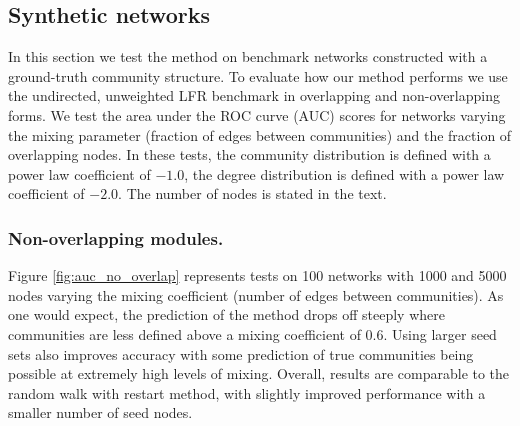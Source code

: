 \documentclass[sigconf]{acmart}
\begin{document}
\subsection{Synthetic networks}
In this section we test the method on benchmark networks constructed with a ground-truth community structure.
To evaluate how our method performs we use the undirected, unweighted LFR benchmark \cite{lancichinetti2008benchmark} in overlapping and non-overlapping forms.
We test the area under the ROC curve (AUC) scores for networks varying the mixing parameter (fraction of edges between communities) and the fraction of overlapping nodes.
In these tests, the community distribution is defined with a power law coefficient of $-1.0$, the degree distribution is defined with a power law coefficient of $-2.0$.
The number of nodes is stated in the text.

\subsubsection{Non-overlapping modules.}
Figure \ref{fig:auc_no_overlap} represents tests on 100 networks with 1000 and 5000 nodes varying the mixing coefficient (number of edges between communities).
As one would expect, the prediction of the method drops off steeply where communities are less defined above a mixing coefficient of 0.6.
Using larger seed sets also improves accuracy with some prediction of true communities being possible at extremely high levels of mixing.
Overall, results are comparable to the random walk with restart method, with slightly improved performance with a smaller number of seed nodes.
\end{document}
